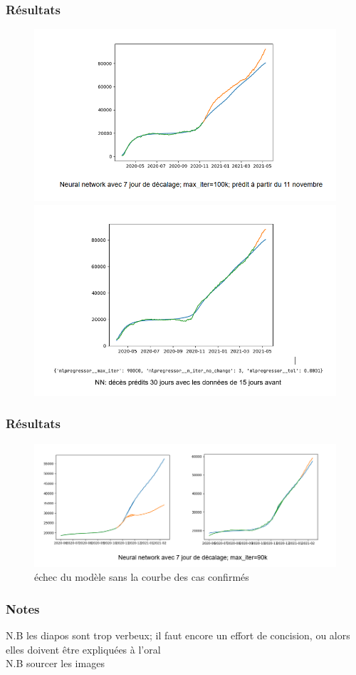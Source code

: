\documentclass{beamer}
\begin{document}
\begin{frame}
	\frametitle{Résultats}
	\begin{figure}[h]
		\centering
		\begin{minipage}{0.5\textwidth}
			\includegraphics[width=\textwidth]{NN_1}
			\centering
		\end{minipage}
		\begin{minipage}{0.5\textwidth}
			\includegraphics[width=\textwidth]{NN_2}
			\centering
		\end{minipage}
	\end{figure}
\end{frame}

\begin{frame}
	\frametitle{Résultats}
	\begin{figure}
		\includegraphics[scale=0.6]{NN_3}
		\caption{échec du modèle sans la courbe des cas confirmés}
	\end{figure}
\end{frame}

\begin{frame}
	\frametitle{Notes}
	\alert{N.B les diapos sont trop verbeux; il faut encore un effort de concision, ou alors elles doivent être expliquées à l'oral}\\
	\alert{N.B sourcer les images}
\end{frame}
\end{document}
